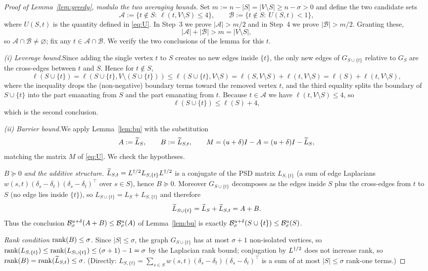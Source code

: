 \begin{proof}[Proof of Lemma~\ref{lem:greedy}, modulo the two averaging bounds]
Set $m:=n-|S|=|V\setminus S|\ge n-\sigma>0$ and define the two candidate sets
\[
  \mathcal{A}:=\{t\notin S:\ \ell(t,V\setminus S)\le 4\},
  \qquad
  \mathcal{B}:=\{t\notin S:\ U(S,t)<1\},
\]
where $U(S,t)$ is the quantity defined in \eqref{eq:U}. In Step~3 we prove
$|\mathcal{A}|>m/2$ and in Step~4 we prove $|\mathcal{B}|>m/2$. Granting these,
\[
  |\mathcal{A}|+|\mathcal{B}|>m=|V\setminus S|,
\]
so $\mathcal{A}\cap\mathcal{B}\ne\varnothing$; fix any
$t\in\mathcal{A}\cap\mathcal{B}$. We verify the two conclusions of the lemma
for this $t$.

\medskip\noindent\emph{(i) Leverage bound.}\quad Since adding the single
vertex $t$ to $S$ creates no new edges inside $\{t\}$, the only new edges of
$G_{S\cup\{t\}}$ relative to $G_S$ are the cross-edges between $t$ and $S$.
Hence for $t\notin S$,
\[
  \ell(S\cup\{t\})
  =\ell(S\cup\{t\},V\setminus(S\cup\{t\}))
  \le\ell(S\cup\{t\},V\setminus S)
  =\ell(S,V\setminus S)+\ell(t,V\setminus S)
  =\ell(S)+\ell(t,V\setminus S),
\]
where the inequality drops the (non-negative) boundary terms toward the
removed vertex $t$, and the third equality splits the boundary of $S\cup\{t\}$
into the part emanating from $S$ and the part emanating from $t$. Because
$t\in\mathcal{A}$ we have $\ell(t,V\setminus S)\le 4$, so
\[
  \ell(S\cup\{t\})\le\ell(S)+4,
\]
which is the second conclusion.

\medskip\noindent\emph{(ii) Barrier bound.}\quad We apply
Lemma~\ref{lem:bu} with the substitution
\[
  A:=\widetilde{L}_S,\qquad B:=\widetilde{L}_{S,t},\qquad
  M=(u+\delta)I-A=(u+\delta)I-\widetilde{L}_S,
\]
matching the matrix $M$ of \eqref{eq:U}. We check the hypotheses.

\emph{$B\succeq0$ and the additive structure.} $\widetilde{L}_{S,t}=L^{\dagger/2}
L_{S,\{t\}}L^{\dagger/2}$ is a conjugate of the PSD matrix $L_{S,\{t\}}$
(a sum of edge Laplacians $w(s,t)(\delta_s-\delta_t)(\delta_s-\delta_t)^{\!\top}$
over $s\in S$), hence $B\succeq0$. Moreover $G_{S\cup\{t\}}$ decomposes as the
edges inside $S$ plus the cross-edges from $t$ to $S$ (no edge lies inside
$\{t\}$), so $L_{S\cup\{t\}}=L_S+L_{S,\{t\}}$ and therefore
\[
  \widetilde{L}_{S\cup\{t\}}=\widetilde{L}_S+\widetilde{L}_{S,t}=A+B .
\]
Thus the conclusion $\mathcal{B}^{u+\delta}_{\sigma}(A+B)\le\mathcal{B}^{u}_{\sigma}(A)$
of Lemma~\ref{lem:bu} is exactly
$\mathcal{B}^{u+\delta}_{\sigma}(S\cup\{t\})\le\mathcal{B}^{u}_{\sigma}(S)$.

\emph{Rank condition $\operatorname{rank}(B)\le\sigma$.} Since $|S|\le\sigma$, the graph
$G_{S\cup\{t\}}$ has at most $\sigma+1$ non-isolated vertices, so
$\operatorname{rank}(L_{S,\{t\}})\le\operatorname{rank}(L_{S\cup\{t\}})\le(\sigma+1)-1=\sigma$
by the Laplacian rank bound; conjugation by $L^{\dagger/2}$ does not increase rank,
so $\operatorname{rank}(B)=\operatorname{rank}(\widetilde{L}_{S,t})\le\sigma$. (Directly:
$L_{S,\{t\}}=\sum_{s\in S}w(s,t)(\delta_s-\delta_t)(\delta_s-\delta_t)^{\!\top}$
is a sum of at most $|S|\le\sigma$ rank-one terms.)


\end{proof}
